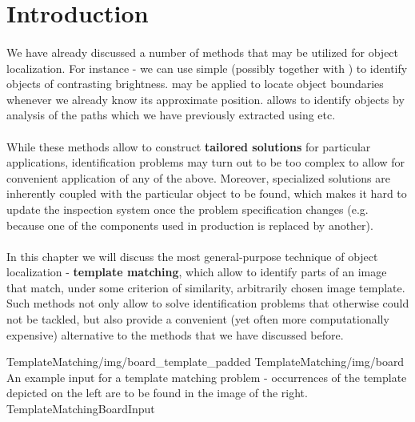 \section{Introduction}

\paragraph*{}
We have already discussed a number of methods that may be utilized for object localization. For instance - we can use simple  (possibly together with ) to identify objects of contrasting brightness.  may be applied to locate object boundaries whenever we already know its approximate position.  allows to identify objects by analysis of the paths which we have previously extracted using  etc.

\paragraph*{}
While these methods allow to construct \textbf{tailored solutions} for particular applications, identification problems may turn out to be too complex to allow for convenient application of any of the above. Moreover, specialized solutions are inherently coupled with the particular object to be found, which makes it hard to update the inspection system once the problem specification changes (e.g. because one of the components used in production is replaced by another).

\paragraph*{}
In this chapter we will discuss the most general-purpose technique of object localization - \textbf{template matching}, which allow to identify parts of an image that match, under some criterion of similarity, arbitrarily chosen image template. Such methods not only allow to solve identification problems that otherwise could not be tackled, but also provide a convenient (yet often more computationally expensive) alternative to the methods that we have discussed before. 

\twoFigures
{TemplateMatching/img/board_template_padded}
{TemplateMatching/img/board}
{An example input for a template matching problem - occurrences of the template depicted on the left are to be found in the image of the right.}
{TemplateMatchingBoardInput}
{\basicWidth}

